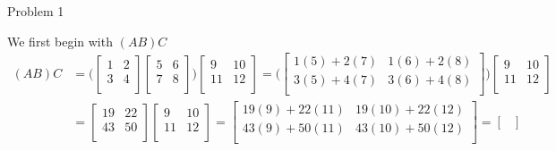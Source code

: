 \begin{problem}{Problem 1}
\begin{highlight}[Solution]
        We first begin with $(AB)C$
        \begin{align*}
            (AB)C & = 
            \Bigg(
                \begin{bmatrix}
                    1 & 2 \\
                    3 & 4 \\
                \end{bmatrix}
                \begin{bmatrix}
                    5 & 6 \\
                    7 & 8 \\
                \end{bmatrix}
            \Bigg)
            \begin{bmatrix}
                9 & 10 \\
                11 & 12 \\
            \end{bmatrix}
            = 
            \Bigg( 
                \begin{bmatrix}
                    1(5) + 2(7) & 1(6) + 2(8) \\
                    3(5) + 4(7) & 3(6) + 4(8) \\ 
                \end{bmatrix}
            \Bigg)
            \begin{bmatrix}
                9 & 10 \\
                11 & 12 \\
            \end{bmatrix} \\
            & = 
            \begin{bmatrix}
                19 & 22 \\
                43 & 50 \\
            \end{bmatrix}
            \begin{bmatrix}
                9 & 10 \\
                11 & 12 \\
            \end{bmatrix}
            = 
            \begin{bmatrix}
                19(9) + 22(11) & 19(10) + 22(12) \\
                43(9) + 50(11) & 43(10) + 50(12) \\
            \end{bmatrix}
            =
            \begin{bmatrix}

\end{bmatrix}
\end{align*}
\end{highlight}
\end{problem}
